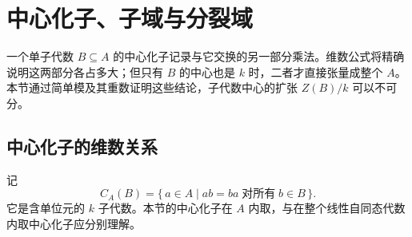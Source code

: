 
\section{中心化子、子域与分裂域}
\label{b2:sec:1702}

一个单子代数 \(B\subseteq A\) 的中心化子记录与它交换的另一部分乘法。维数公式将精确说明这两部分各占多大；但只有 \(B\) 的中心也是 \(k\) 时，二者才直接张量成整个 \(A\)。本节通过简单模及其重数证明这些结论，子代数中心的扩张 \(Z(B)/k\) 可以不可分。

%
%

\subsection{中心化子的维数关系}
\label{b2:subsec:1702:01}

记
\[
	C_A(B)=\{\,a\in A\mid ab=ba\;\text{对所有}\;b\in B\,\}.
\]
它是含单位元的 \(k\) 子代数。本节的中心化子在 \(A\) 内取，与在整个线性自同态代数内取中心化子应分别理解。

